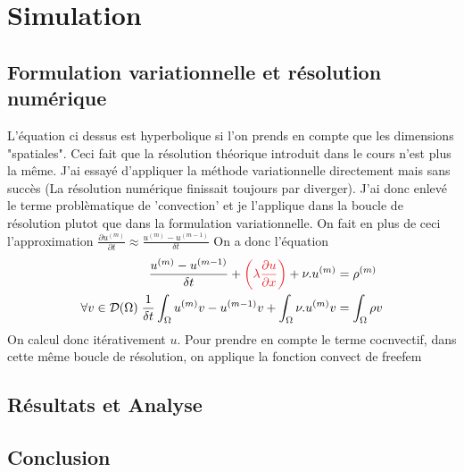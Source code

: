 \documentclass[french]{article}
\begin{document}
    
    \section{Simulation}
    \subsection{Formulation variationnelle et résolution numérique}
    L'équation ci dessus est hyperbolique si l'on prends en compte que les dimensions "spatiales".
    Ceci fait que la résolution théorique introduit dans le cours n'est plus la même. J'ai essayé d'appliquer la méthode
    variationnelle directement mais sans succès (La résolution numérique finissait toujours par diverger). J'ai donc enlevé le terme problèmatique
    de 'convection' et je l'applique dans la boucle de résolution plutot que dans la formulation variationnelle. On fait en plus de ceci l'approximation 
    $\frac{\partial u^{(m)}}{\partial t} \approx \frac{u^{(m)} - u^{(m-1)}}{\delta t}$ On a donc l'équation
    \begin{alignat*}{10}
        \frac{u^{(m)} - u^{(m-1)}}{\delta t} + 
        \textcolor{Red}{\left( \lambda\frac{\partial u}{\partial x}\right)} 
        + \nu.u^{(m)} &= \rho^{(m)} \\
        \forall v \in \mathcal{D}(\Omega) \; \frac{1}{\delta t} \int_{\Omega} u^{(m)}v - u^{(m-1)}v + \int_{\Omega} \nu.u^{(m)}v
        &= \int_{\Omega} \rho v
    \end{alignat*}
    On calcul donc itérativement $u$. Pour prendre en compte le terme cocnvectif, dans cette même boucle de résolution, on applique la fonction convect de freefem 
    \subsection{Résultats et Analyse}
    \subsection{Conclusion}
    
\end{document}
